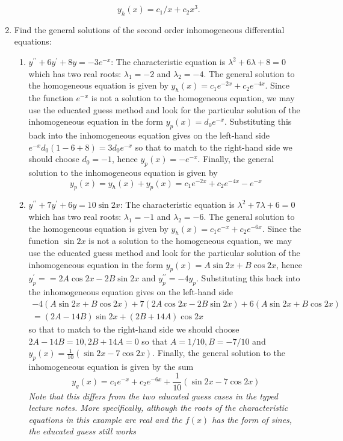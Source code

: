 \documentclass[11pt,a4paper,twoside]{article}
\begin{document}
\begin{enumerate}[\bfseries A.]
		$$
		y_h(x) = c_1/x + c_2x^3.
		$$
		\item Find the general solutions of the second order inhomogeneous differential equations:
		\begin{enumerate}[\bfseries 1)]
			\item $y^{\prime\prime} + 6y^\prime + 8y = -3e^{-x}$: The characteristic equation is $\lambda^2 + 6\lambda + 8 = 0$ which has two real roots: $\lambda_1 = −2$ and $\lambda_2 = −4$. The general solution to the homogeneous equation is given by $y_h(x) = c_1e^{-2x} + c_2e^{-4x}$. Since the function $e^{−x}$ is not a solution to the homogeneous equation, we may use the educated guess method and look for the particular solution of the inhomogeneous equation in the form $y_p(x) = d_0e^{-x}$. Substituting this back into the inhomogeneous equation gives on the left-hand side $e^{-x}d_0(1-6+8) = 3d_0e^{-x}$ so that to match to the right-hand side we should choose $d_0 = -1$, hence $y_p(x) = -e^{-x}$. Finally, the general solution to the inhomogeneous equation is given by
			$$
			y_p(x) = y_h(x) + y_p(x) = c_1e^{-2x} + c_2e^{-4x} - e^{-x}
			$$
			\item $y^{\prime\prime} + 7y^\prime + 6y = 10\sin 2x$: The characteristic equation is $\lambda^2 + 7\lambda + 6 = 0$ which has two real roots: $\lambda_1 = −1$ and $\lambda_2 = −6$. The general solution to the homogeneous equation is given by $y_h(x) = c_1e^{-x} + c_2e^{-6x}$. Since the function $\sin 2x$ is not a solution to the homogeneous equation, we may use the educated guess method and look for the particular solution of the inhomogeneous equation in the form $y_p(x) = A\sin 2x + B\cos 2x$, hence $y_p^\prime = = 2A \cos 2x − 2B \sin 2x$ and $y^{\prime\prime}_p = -4y_p$. Substituting this back into the inhomogeneous equation gives on the left-hand side
			\begin{gather*}
				−4(A \sin 2x + B \cos 2x) + 7 (2A \cos 2x − 2B \sin 2x) + 6(A \sin 2x + B \cos 2x)\\
				= (2A − 14B) \sin 2x + (2B + 14A) \cos 2x
			\end{gather*}
			so that to match to the right-hand side we should choose $2A − 14B = 10, 2B + 14A = 0$ so that $A = 1/10, B = −7/10$ and $y_p(x) = \frac{1}{10}(\sin 2x-7\cos 2x)$. Finally, the general solution to the inhomogeneous equation is given by the sum
			$$
			y_g(x) = c_1e^{-x} + c_2e^{-6x} + \frac{1}{10}(\sin 2x-7\cos 2x)
			$$
			\textit{Note that this differs from the two educated guess cases in the typed lecture notes. More specifically, although the roots of the characteristic equations in this example are real and the $f(x)$ has the form of sines, the educated guess still works}

\end{enumerate}
\end{enumerate}
\end{document}
